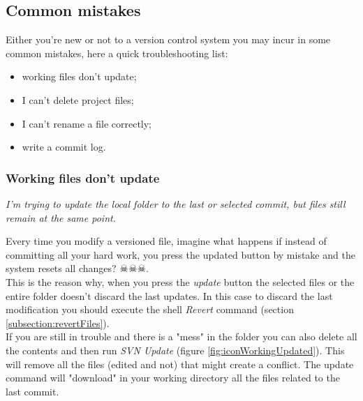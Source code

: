 \subsection{Common mistakes}
\label{section:commonMistakes}

Either you're new or not to a version control system you may incur in some common mistakes, here a quick troubleshooting list:

\begin{itemize}

    \item working files don't update;
    \item I can't delete project files;
    \item I can't rename a file correctly;
    \item write a commit log.
    
\end{itemize}







\subsubsection{Working files don't update}
\label{subsubsection:UpdateNotWork}

\textit{I'm trying to update the local folder to the last or selected commit, but files still remain at the same point.}\newline

Every time you modify a versioned file, imagine what happens if instead of committing all your hard work, you press the updated button by mistake and the system resets all changes? $\skull \skull \skull$.\\


This is the reason why, when you press the \textit{update} button the selected files or the entire folder doesn't discard the last updates. In this case to discard the last modification you should execute the shell \textit{Revert} command (section \ref{subsection:revertFiles}).\\


If you are still in trouble and there is a "mess" in the folder you can also delete all the contents and then run \textit{SVN Update} (figure \ref{fig:iconWorkingUpdated}). This will remove all the files (edited and not) that might create a conflict. The update command will "download" in your working directory all the files related to the last commit.














